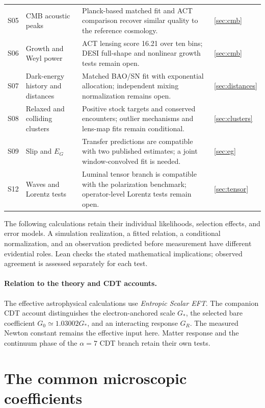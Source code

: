 \begin{longtable}{@{}p{}p{}p{}p{}@{}}
S05 & CMB acoustic peaks & Planck-based matched fit and ACT comparison recover similar quality to the reference cosmology. & \ref{sec:cmb}\\
S06 & Growth and Weyl power & ACT lensing score 16.21 over ten bins; DESI full-shape and nonlinear growth tests remain open. & \ref{sec:cmb}\\
S07 & Dark-energy history and distances & Matched BAO/SN fit with exponential allocation; independent mixing normalization remains open. & \ref{sec:distances}\\
S08 & Relaxed and colliding clusters & Positive stock targets and conserved encounters; outlier mechanisms and lens-map fits remain conditional. & \ref{sec:clusters}\\
S09 & Slip and $E_G$ & Transfer predictions are compatible with two published estimates; a joint window-convolved fit is needed. & \ref{sec:eg}\\
S12 & Waves and Lorentz tests & Luminal tensor branch is compatible with the polarization benchmark; operator-level Lorentz tests remain open. & \ref{sec:tensor}\\
\bottomrule
\end{longtable}
\endgroup
{}

The following calculations retain their individual likelihoods,
selection effects, and error models. A simulation realization, a fitted
relation, a conditional normalization, and an observation predicted
before measurement have different evidential roles. Lean checks the
stated mathematical implications; observed agreement is assessed
separately for each test.

\paragraph{Relation to the theory and CDT accounts.}
The effective astrophysical calculations use \emph{Entropic Scalar EFT}.
The companion CDT account distinguishes the electron-anchored scale
$G_*$, the selected bare coefficient $G_0\simeq1.03002G_*$, and an
interacting response $G_R$. The measured Newton constant remains the
effective input here. Matter response and the continuum phase of the
$\alpha=7$ CDT branch retain their own tests. 

\section{The common microscopic coefficients}
\label{sec:micro}

